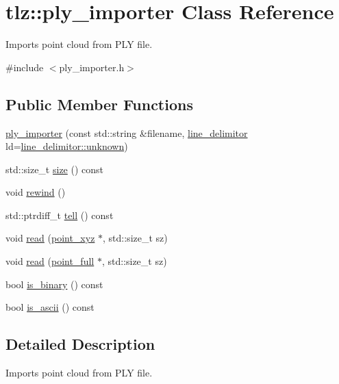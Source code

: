 \hypertarget{classtlz_1_1ply__importer}{}\section{tlz\+:\+:ply\+\_\+importer Class Reference}
\label{classtlz_1_1ply__importer}


Imports point cloud from P\+LY file.  




{\ttfamily \#include $<$ply\+\_\+importer.\+h$>$}

\subsection*{Public Member Functions}
\begin{DoxyCompactItemize}
\item 
\hyperlink{classtlz_1_1ply__importer_a839033d91e5fd741f77dee40df2100c4}{ply\+\_\+importer} (const std\+::string \&filename, \hyperlink{namespacetlz_a9643974618d6e98138d9b009f5f6123d}{line\+\_\+delimitor} ld=\hyperlink{namespacetlz_a9643974618d6e98138d9b009f5f6123daad921d60486366258809553a3db49a4a}{line\+\_\+delimitor\+::unknown})
\item 
std\+::size\+\_\+t \hyperlink{classtlz_1_1ply__importer_a598f029fa08ee8805c58aab4da6181c3}{size} () const 
\item 
void \hyperlink{classtlz_1_1ply__importer_afe3049c4802c6928ebca0612b371a78c}{rewind} ()
\item 
std\+::ptrdiff\+\_\+t \hyperlink{classtlz_1_1ply__importer_a1b181b2af7d2ba5624c1f076a84ce3fd}{tell} () const 
\item 
void \hyperlink{classtlz_1_1ply__importer_a4caef5aaee64c0fa8a12876ec02750df}{read} (\hyperlink{structtlz_1_1point__xyz}{point\+\_\+xyz} $\ast$, std\+::size\+\_\+t sz)
\item 
void \hyperlink{classtlz_1_1ply__importer_af956b9c491db81db9c522c793137fab1}{read} (\hyperlink{structtlz_1_1point__full}{point\+\_\+full} $\ast$, std\+::size\+\_\+t sz)
\item 
bool \hyperlink{classtlz_1_1ply__importer_ae17e8e5043bf6e5b53c43d91d73ea20d}{is\+\_\+binary} () const 
\item 
bool \hyperlink{classtlz_1_1ply__importer_aa398f1eb91c00aa9967bc5b9dbc2ef15}{is\+\_\+ascii} () const 
\end{DoxyCompactItemize}


\subsection{Detailed Description}
Imports point cloud from P\+LY file. 

